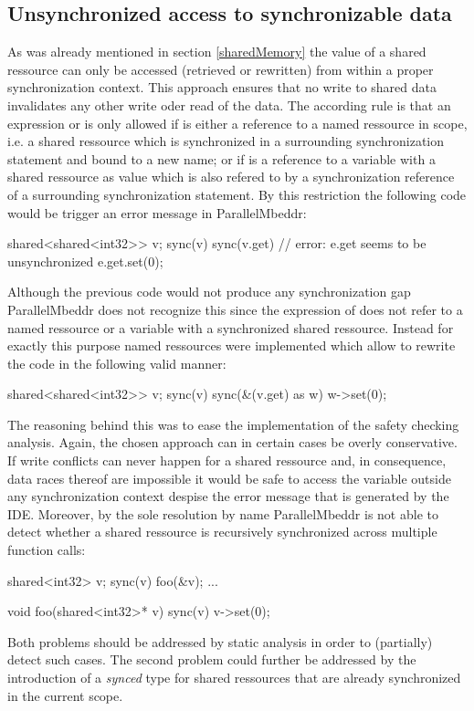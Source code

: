 \subsection{Unsynchronized access to synchronizable data}
As was already mentioned in section \ref*{sharedMemory} the value of a shared ressource can only be accessed (retrieved or rewritten) from within a proper synchronization context. This approach ensures that no write to shared data invalidates any other write oder read of the data. The according rule is that an expression  or  is only allowed if  is either a reference to a named ressource in scope, i.e. a shared ressource which is synchronized in a surrounding synchronization statement and bound to a new name; or if  is a reference to a variable with a shared ressource as value which is also refered to by a synchronization reference of a surrounding synchronization statement. By this restriction the following code would be trigger an error message in ParallelMbeddr:
\begin{ccode}
shared<shared<int32>> v;
sync(v) {
  sync(v.get) {
    // error: e.get seems to be unsynchronized
    e.get.set(0);
  }
}
\end{ccode}
Although the previous code would not produce any synchronization gap ParallelMbeddr does not recognize this since the expression  of  does not refer to a named ressource or a variable with a synchronized shared ressource. Instead for exactly this purpose named ressources were implemented which allow to rewrite the code in the following valid manner:
\begin{ccode}
shared<shared<int32>> v;
sync(v) {
  sync(&(v.get) as w) {
    w->set(0);
  }
}
\end{ccode}
The reasoning behind this was to ease the implementation of the safety checking analysis. Again, the chosen approach can in certain cases be overly conservative. If write conflicts can never happen for a shared ressource and, in consequence, data races thereof are impossible it would be safe to access the variable outside any synchronization context despise the error message that is generated by the IDE. Moreover, by the sole resolution by name ParallelMbeddr is not able to detect whether a shared ressource is recursively synchronized across multiple function calls:
\begin{ccode}
  shared<int32> v;
  sync(v) { foo(&v); }
  ...

void foo(shared<int32>* v) {
  sync(v) { v->set(0); }
}
\end{ccode}
Both problems should be addressed by static analysis in order to (partially) detect such cases. The second problem could further be addressed by the introduction of a \textit{synced} type for shared ressources that are already synchronized in the current scope.

